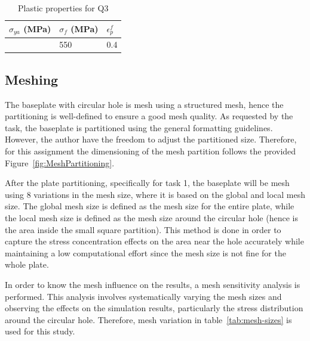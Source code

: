 \documentclass[12pt]{article}
\begin{document}
\begin{table}[H]
    \centering
    \caption{Plastic properties for Q3}
    \label{tab:materialQ3-properties}
    \begin{tabular}{lll}
        \toprule
            \centering $\sigma_{ya}$ (MPa) & $\sigma_f$ (MPa) & $\epsilon_{p}^f$  \\
            \midrule
            \centering 360 & 550 & 0.4  \\
            \bottomrule
    \end{tabular}
\end{table}

\subsection{Meshing}

\hspace{2em}The baseplate with circular hole is mesh using a structured mesh, hence 
the partitioning is well-defined to ensure a good mesh quality. As requested by the task, 
the baseplate is partitioned using the general formatting guidelines. However, the author 
have the freedom to adjust the partitioned size. Therefore, for this assignment the dimensioning
of the mesh partition follows the provided Figure~\ref{fig:MeshPartitioning}. 

\hspace{2em} After the plate partitioning, specifically for task 1, the baseplate will be mesh
using 8 variations in the mesh size, where it is based on the global and local mesh size. 
The global mesh size is defined as the mesh size for the entire plate, 
while the local mesh size is defined as the mesh size around the circular hole (hence is the
area inside the small square partition). This method is done in order to capture the stress
concentration effects on the area near the hole accurately while maintaining a low computational
effort since the mesh size is not fine for the whole plate.

\hspace{2em}In order to know the mesh influence on the results, a mesh sensitivity
analysis is performed. This analysis involves systematically varying the mesh sizes and observing the effects on the simulation results, 
particularly the stress distribution around the circular hole. Therefore, mesh variation in
table~\ref{tab:mesh-sizes} is used for this study. 
\end{document}
